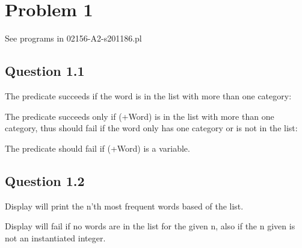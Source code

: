\section*{Problem 1}
See programs in 02156-A2-s201186.pl

\subsection*{Question 1.1}
The predicate succeeds if the word is in the list with more than one category:

The predicate succeeds only if (+Word) is in the list with more than one category, thus should fail if the word only has one category or is not in the list:

The predicate should fail if (+Word) is a variable.

\newpage

\subsection*{Question 1.2}
Display will print the n'th most frequent words based of the list.

Display will fail if no words are in the list for the given n, also if the n given is not an instantiated integer.
